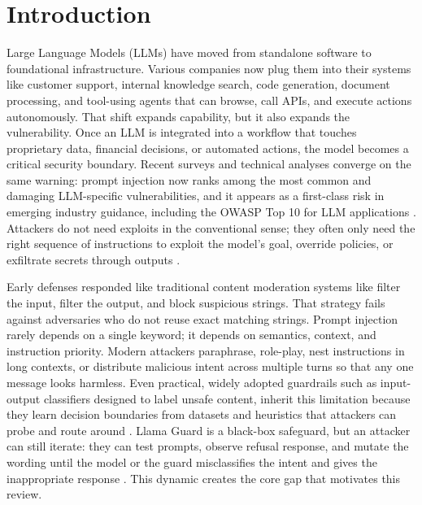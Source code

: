 \documentclass[conference]{IEEEtran}
\begin{document}
\section{Introduction}

Large Language Models (LLMs) have moved from standalone software to foundational infrastructure. Various companies now plug them into their systems like customer support, internal knowledge search, code generation, document processing, and tool-using agents that can browse, call APIs, and execute actions autonomously. That shift expands capability, but it also expands the vulnerability. Once an LLM is integrated into a workflow that touches proprietary data, financial decisions, or automated actions, the model becomes a critical security boundary. Recent surveys and technical analyses converge on the same warning: prompt injection now ranks among the most common and damaging LLM-specific vulnerabilities, and it appears as a first-class risk in emerging industry guidance, including the OWASP Top 10 for LLM applications \cite{b1,b3}. Attackers do not need exploits in the conventional sense; they often only need the right sequence of instructions to exploit the model's goal, override policies, or exfiltrate secrets through  outputs \cite{b1,b3}.

Early defenses responded like traditional content moderation systems like filter the input, filter the output, and block suspicious strings. That strategy fails against adversaries who do not reuse exact matching strings. Prompt injection rarely depends on a single keyword; it depends on semantics, context, and instruction priority. Modern attackers paraphrase, role-play, nest instructions in long contexts, or distribute malicious intent across multiple turns so that any one message looks harmless. Even practical, widely adopted guardrails such as input-output classifiers designed to label unsafe content, inherit this limitation because they learn decision boundaries from datasets and heuristics that attackers can probe and route around \cite{b17}. Llama Guard is a black-box safeguard, but an attacker can still iterate: they can test prompts, observe refusal response, and mutate the wording until the model or the guard misclassifies the intent and gives the inappropriate response \cite{b17}. This dynamic creates the core gap that motivates this review.
\end{document}
